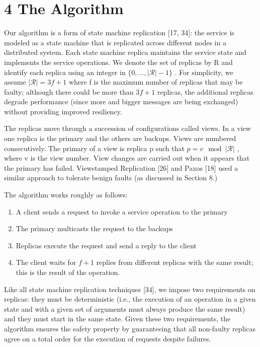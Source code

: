 \documentclass[
]{article}
\providecommand{\tightlist}{%
  \setlength{\itemsep}{0pt}\setlength{\parskip}{0pt}}
\begin{document}
\section{4 The Algorithm}\label{the-algorithm}

Our algorithm is a form of state machine replication {[}17, 34{]}: the
service is modeled as a state machine that is replicated across
different nodes in a distributed system. Each state machine replica
maintains the service state and implements the service operations. We
denote the set of replicas by R and identify each replica using an
integer in \(\{0,\ldots,|\mathcal{R}|-1\}\) . For simplicity, we assume
\(|\mathcal{R}|=3f+1\) where f is the maximum number of replicas that
may be faulty; although there could be more than \(3f+1\) replicas, the
additional replicas degrade performance (since more and bigger messages
are being exchanged) without providing improved resiliency.

The replicas move through a succession of configurations called views.
In a view one replica is the primary and the others are backups. Views
are numbered consecutively. The primary of a view is replica p such that
\(p = v \mod |\mathcal{R}|\) , where v is the view number. View changes
are carried out when it appears that the primary has failed. Viewstamped
Replication {[}26{]} and Paxos {[}18{]} used a similar approach to
tolerate benign faults (as discussed in Section 8.)

The algorithm works roughly as follows:

\begin{enumerate}
\def\labelenumi{\arabic{enumi}.}
\tightlist
\item
  A client sends a request to invoke a service operation to the
  primary\\
\item
  The primary multicasts the request to the backups\\
\item
  Replicas execute the request and send a reply to the client\\
\item
  The client waits for \(f + 1\) replies from different replicas with
  the same result; this is the result of the operation.
\end{enumerate}

Like all state machine replication techniques {[}34{]}, we impose two
requirements on replicas: they must be deterministic (i.e., the
execution of an operation in a given state and with a given set of
arguments must always produce the same result) and they must start in
the same state. Given these two requirements, the algorithm ensures the
safety property by guaranteeing that all non-faulty replicas agree on a
total order for the execution of requests despite failures.
\end{document}
